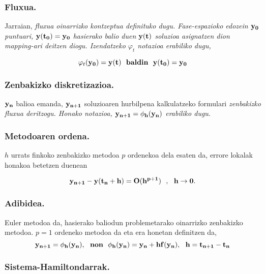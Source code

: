 \subsubsection*{Fluxua.}

Jarraian, \it{fluxua} oinarrizko kontzeptua definituko dugu. Fase-espazioko edozein $\bf{y_0}$ puntuari, $\bf{y(t_0)}=\bf{y_0}$ hasierako balio duen $\bf{y(t)}$ soluzioa asignatzen dion mapping-ari deitzen diogu. Izendatzeko $\varphi_t$ notazioa erabiliko dugu,

\begin{equation*}
\varphi_t(\bf{y_0})=\bf{y}(t) \ \ baldin \ \ \bf{y}(t_0)=\bf{y_0}
\end{equation*}
  
\subsubsection*{Zenbakizko diskretizazioa.}

$\bf{y_{n}}$ balioa emanda, $\bf{y_{n+1}}$ soluzioaren hurbilpena kalkulatzeko formulari \it{zenbakizko fluxua} deritzogu. Honako notazioa, $\bf{y_{n+1}}=\phi_h(\bf{y_n})$ erabiliko dugu.
 
\subsubsection*{Metodoaren ordena.}
$h$ urrats finkoko zenbakizko metodoa $p$ ordenekoa dela esaten da, errore lokalak honakoa betetzen duenean

\begin{equation} \label{eq:4}
\bf{y}_{n+1}-\bf{y}(t_{n}+h) = O(h^{p+1})\ \ , \ \ h \rightarrow 0.
\end{equation}

\subsubsection*{Adibidea.}
Euler metodoa da, hasierako baliodun problemetarako oinarrizko zenbakizko metodoa. $p=1$ ordeneko metodoa da eta era honetan definitzen da,
\begin{equation}
\label{eq41}
\bf{y}_{n+1}=\phi_h(\bf{y_n}), \ \ non \ \ \phi_h(\bf{y_n})=\bf{y}_n+h \bf{f}(\bf{y}_n) ,  \ \ h=t_{n+1}-t_{n}
\end{equation} 

\subsubsection{Sistema-Hamiltondarrak.}


